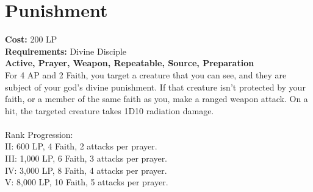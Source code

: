 \section{Punishment}\label{prayer:punishment}
\textbf{Cost:} 200 LP\\
\textbf{Requirements:} Divine Disciple \\
\textbf{Active, Prayer, Weapon, Repeatable, Source, Preparation}\\
For 4 AP and 2 Faith, you target a creature that you can see, and they are subject of your god's divine punishment.
If that creature isn't protected by your faith, or a member of the same faith as you, make a ranged weapon attack.
On a hit, the targeted creature takes 1D10 radiation damage.\\
\\
Rank Progression:\\
II: 600 LP, 4 Faith, 2 attacks per prayer.\\
III: 1,000 LP, 6 Faith, 3 attacks per prayer.\\
IV: 3,000 LP, 8 Faith, 4 attacks per prayer.\\
V: 8,000 LP, 10 Faith, 5 attacks per prayer.\\